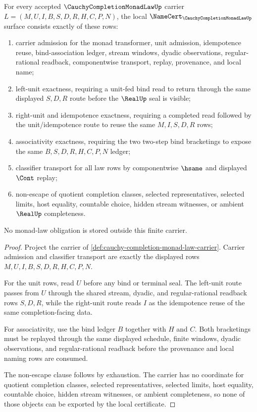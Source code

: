 \begin{theorem}
\label{thm:cauchy-completion-monad-law-namecert-obligations}
For every accepted $\CauchyCompletionMonadLawUp$ carrier $L=(M,U,I,B,S,D,R,H,C,P,N)$, the local $\NameCert_{\CauchyCompletionMonadLawUp}$ surface consists exactly of these rows:
\begin{enumerate}
\item carrier admission for the monad transformer, unit admission, idempotence reuse, bind-association ledger, stream windows, dyadic observations, regular-rational readback, componentwise transport, replay, provenance, and local name;
\item left-unit exactness, requiring a unit-fed bind read to return through the same displayed $S,D,R$ route before the $\RealUp$ seal is visible;
\item right-unit and idempotence exactness, requiring a completed read followed by the unit/idempotence route to reuse the same $M,I,S,D,R$ rows;
\item associativity exactness, requiring the two two-step bind bracketings to expose the same $B,S,D,R,H,C,P,N$ ledger;
\item classifier transport for all law rows by componentwise $\hsame$ and displayed $\Cont$ replay;
\item non-escape of quotient completion classes, selected representatives, selected limits, host equality, countable choice, hidden stream witnesses, or ambient $\RealUp$ completeness.
\end{enumerate}
No monad-law obligation is stored outside this finite carrier.
\end{theorem}
\begin{proof}
Project the carrier of \autoref{def:cauchy-completion-monad-law-carrier}. Carrier admission and classifier transport are exactly the displayed rows $M,U,I,B,S,D,R,H,C,P,N$.

For the unit rows, read $U$ before any bind or terminal seal. The left-unit route passes from $U$ through the shared stream, dyadic, and regular-rational readback rows $S,D,R$, while the right-unit route reads $I$ as the idempotence reuse of the same completion-facing data.

For associativity, use the bind ledger $B$ together with $H$ and $C$. Both bracketings must be replayed through the same displayed schedule, finite windows, dyadic observations, and regular-rational readback before the provenance and local naming rows are consumed.

The non-escape clause follows by exhaustion. The carrier has no coordinate for quotient completion classes, selected representatives, selected limits, host equality, countable choice, hidden stream witnesses, or ambient completeness, so none of those objects can be exported by the local certificate.
\end{proof}

